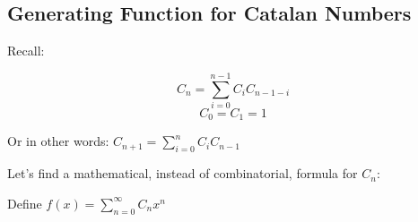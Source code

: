 
% 






% 



\noindent

\subsection{Generating Function for Catalan Numbers}

Recall:

$$C_n = \sum_{i=0}^{n-1} C_i C_{n-1-i} $$ $$ C_0 = C_1 = 1$$

Or in other words: $C_{n+1} = \sum_{i=0}^{n} C_i C_{n-1}$

\bigbreak

\bigbreak

\noindent
Let's find a mathematical, instead of combinatorial, formula for $C_n$:

\smallbreak

\noindent Define $f(x) = \sum_{n=0}^{\infty} C_n x^n$

